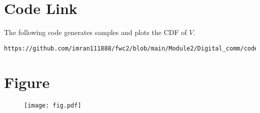 \documentclass[journal,12pt,twocolumn]{article}
\begin{document}
\section{\textbf{Code Link}}
The following code generates samples and plots the CDF of $V$.


\begin{lstlisting}
https://github.com/imran111888/fwc2/blob/main/Module2/Digital_comm/code/digi.py
\end{lstlisting}



\section{\textbf{Figure }}
\begin{figure}[h]
    \centering
\texttt{[image: fig.pdf]}
    \label{fig:my_label}
\end{figure}
\end{document}
